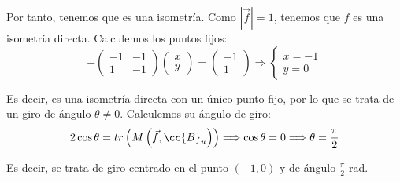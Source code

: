 \begin{ejercicio}
    Por tanto, tenemos que es una isometría. Como $\left|\vec{f}\right| = 1$, tenemos que $f$ es una isometría directa. Calculemos los puntos fijos:
    \begin{equation*}
        -\left(\begin{array}{cc}
            -1 & -1 \\
            1 & -1
        \end{array}\right)
        \left(\begin{array}{c}
            x\\y
        \end{array}\right)
        = \left(\begin{array}{c}
            -1 \\1
        \end{array}\right) \Longrightarrow \left\{\begin{array}{l}
            x = -1\\
            y=0
        \end{array}\right.
    \end{equation*}

    Es decir, es una isometría directa con un único punto fijo, por lo que se trata de un giro de ángulo $\theta \neq 0$. Calculemos su ángulo de giro:
    \begin{equation*}
        2\cos\theta = tr\left(M\left(\vec{f}, \cc{B}_u\right)\right) \Longrightarrow \cos\theta  = 0 \Longrightarrow \theta = \frac{\pi}{2}
    \end{equation*}

    Es decir, se trata de giro centrado en el punto $(-1,0)$ y de ángulo $\frac{\pi}{2}$ rad.
\end{ejercicio}

